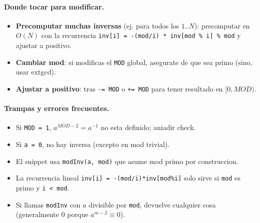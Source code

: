 \paragraph{Donde tocar para modificar.}
\begin{itemize}\setlength\itemsep{0pt}
	\item \textbf{Precomputar muchas inversas} (ej. para todos los $1..N$): precomputar en $O(N)$ con la recurrencia \texttt{inv[i] = -(mod/i) * inv[mod \% i] \% mod} y ajustar a positivo.
	\item \textbf{Cambiar mod}: si modificas el \texttt{MOD} global, asegurate de que sea primo (sino, usar extgcd).
	\item \textbf{Ajustar a positivo}: tras \texttt{-= MOD} o \texttt{+= MOD} para tener resultado en $[0, MOD)$.
\end{itemize}

\paragraph{Trampas y errores frecuentes.}
\begin{itemize}\setlength\itemsep{0pt}
	\item Si \texttt{MOD = 1}, $a^{MOD-2} = a^{-1}$ no esta definido; aniadir check.
	\item Si \texttt{a = 0}, no hay inversa (excepto en mod trivial).
	\item El snippet usa \texttt{modInv(a, mod)} que asume mod primo por construccion.
	\item La recurrencia lineal \texttt{inv[i] = -(mod/i)*inv[mod\%i]} solo sirve si \texttt{mod} es primo y \texttt{i < mod}.
	\item Si llamas \texttt{modInv} con $a$ divisible por \texttt{mod}, devuelve cualquier cosa (generalmente 0 porque $a^{m-2} \equiv 0$).
\end{itemize}

